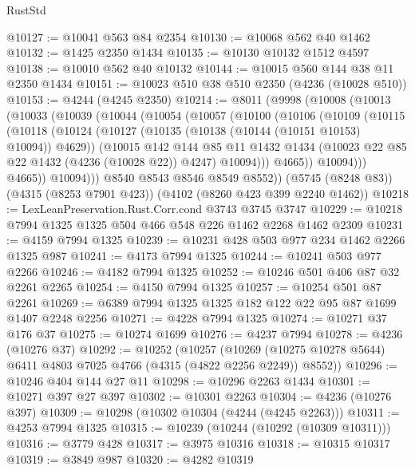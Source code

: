 \begin{lexlean}{RustStd}
\begin{coremodule}
@10127 := @10041 @563 @84 @2354
@10130 := @10068 @562 @40 @1462
@10132 := @1425 @2350 @1434
@10135 := @10130 @10132 @1512 @4597
@10138 := @10010 @562 @40 @10132
@10144 := @10015 @560 @144 @38 @11 @2350 @1434
@10151 := @10023 @510 @38 @510 @2350 (@4236 (@10028 @510))
@10153 := @4244 (@4245 @2350)
@10214 := @8011
    (@9998
      (@10008
        (@10013
          (@10033
            (@10039
              (@10044
                (@10054
                  (@10057
                    (@10100
                      (@10106
                        (@10109
                          (@10115
                            (@10118
                              (@10124
                                (@10127 (@10135 (@10138 (@10144 (@10151 @10153) @10094)) @4629))
                                (@10015
                                  @142
                                  @144
                                  @85
                                  @11
                                  @1432
                                  @1434
                                  (@10023 @22 @85 @22 @1432 (@4236 (@10028 @22)) @4247)
                                  @10094)))
                            @4665))
                        @10094)))
                  @4665))
              @10094)))
        @8540
        @8543
        @8546
        @8549
        @8552))
    (@5745 (@8248 @83))
    (@4315 (@8253 @7901 @423))
    (@4102 (@8260 @423 @399 @2240 @1462))
@10218 := LexLeanPreservation.Rust.Corr.cond @3743 @3745 @3747
@10229 := @10218 @7994 @1325 @1325 @504 @466 @548 @226 @1462 @2268 @1462 @2309
@10231 := @4159 @7994 @1325
@10239 := @10231 @428 @503 @977 @234 @1462 @2266 @1325 @987
@10241 := @4173 @7994 @1325
@10244 := @10241 @503 @977 @2266
@10246 := @4182 @7994 @1325
@10252 := @10246 @501 @406 @87 @32 @2261 @2265
@10254 := @4150 @7994 @1325
@10257 := @10254 @501 @87 @2261
@10269 := @6389 @7994 @1325 @1325 @182 @122 @22 @95 @87 @1699 @1407 @2248 @2256
@10271 := @4228 @7994 @1325
@10274 := @10271 @37 @176 @37
@10275 := @10274 @1699
@10276 := @4237 @7994
@10278 := @4236 (@10276 @37)
@10292 := @10252
    (@10257
      (@10269 (@10275 @10278 @5644) @6411 @4803 @7025 @4766 (@4315 (@4822 @2256 @2249)) @8552))
@10296 := @10246 @404 @144 @27 @11
@10298 := @10296 @2263 @1434
@10301 := @10271 @397 @27 @397
@10302 := @10301 @2263
@10304 := @4236 (@10276 @397)
@10309 := @10298 (@10302 @10304 (@4244 (@4245 @2263)))
@10311 := @4253 @7994 @1325
@10315 := @10239 (@10244 (@10292 (@10309 @10311)))
@10316 := @3779 @428
@10317 := @3975 @10316
@10318 := @10315 @10317
@10319 := @3849 @987
@10320 := @4282 @10319

\end{coremodule}
\end{lexlean}
